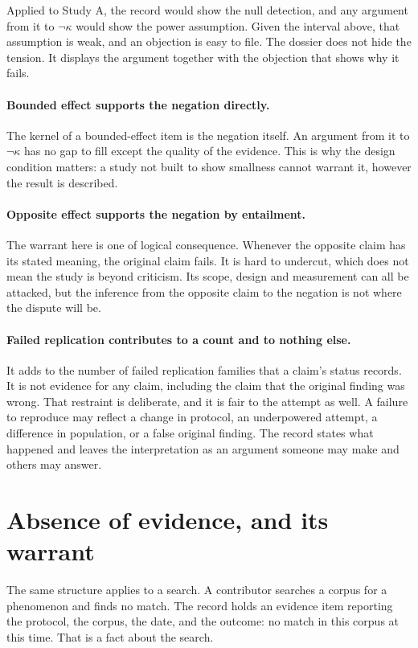\documentclass[11pt]{article}
\newcommand{\nk}[1]{\neg #1}
\begin{document}
Applied to Study A, the record would show the null detection, and any argument from it to $\nk\kappa$ would show the power assumption. Given the interval above, that assumption is weak, and an objection is easy to file. The dossier does not hide the tension. It displays the argument together with the objection that shows why it fails.

\paragraph{Bounded effect supports the negation directly.} The kernel of a bounded-effect item is the negation itself. An argument from it to $\nk\kappa$ has no gap to fill except the quality of the evidence. This is why the design condition matters: a study not built to show smallness cannot warrant it, however the result is described.

\paragraph{Opposite effect supports the negation by entailment.} The warrant here is one of logical consequence. Whenever the opposite claim has its stated meaning, the original claim fails. It is hard to undercut, which does not mean the study is beyond criticism. Its scope, design and measurement can all be attacked, but the inference from the opposite claim to the negation is not where the dispute will be.

\paragraph{Failed replication contributes to a count and to nothing else.} It adds to the number of failed replication families that a claim's status records. It is not evidence for any claim, including the claim that the original finding was wrong. That restraint is deliberate, and it is fair to the attempt as well. A failure to reproduce may reflect a change in protocol, an underpowered attempt, a difference in population, or a false original finding. The record states what happened and leaves the interpretation as an argument someone may make and others may answer.

\section{Absence of evidence, and its warrant}\label{sec:search}

The same structure applies to a search. A contributor searches a corpus for a phenomenon and finds no match. The record holds an evidence item reporting the protocol, the corpus, the date, and the outcome: no match in this corpus at this time. That is a fact about the search.
\end{document}

